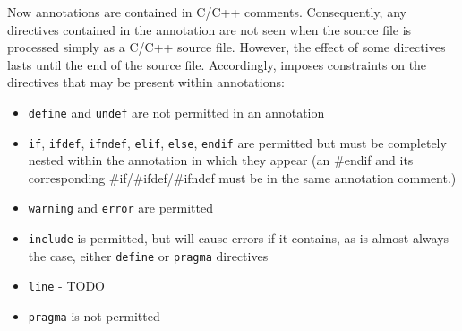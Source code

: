 Now \acslb annotations are contained in C/C++ comments. 
Consequently, any directives contained in the annotation are not seen when the source file is processed simply as a C/C++ source file. However, the effect of some directives lasts until the end of the source file. 
Accordingly, \NAME imposes constraints on the directives that may be present within annotations:
\begin{itemize}
	\item \texttt{define} and \texttt{undef} are not permitted in an annotation
	\item \texttt{if}, \texttt{ifdef}, \texttt{ifndef}, \texttt{elif}, \texttt{else}, \texttt{endif} are permitted but must be completely nested within the annotation in which they appear (an \#endif and its corresponding \#if/\#ifdef/\#ifndef must be in the same annotation comment.)
	\item \texttt{warning} and \texttt{error} are permitted
	\item \texttt{include} is permitted, but will cause errors if it contains, as is almost always the case, either \texttt{define} or \texttt{pragma} directives
	\item \texttt{line} - TODO
	\item \texttt{pragma} is not permitted
\end{itemize}




